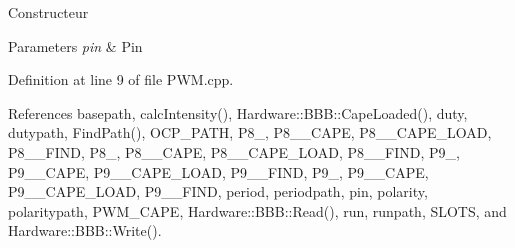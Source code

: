 Constructeur 


\begin{DoxyParams}{Parameters}
{\em pin} & Pin\\
\hline
\end{DoxyParams}


Definition at line 9 of file P\+W\+M.\+cpp.



References basepath, calc\+Intensity(), Hardware\+::\+B\+B\+B\+::\+Cape\+Loaded(), duty, dutypath, Find\+Path(), O\+C\+P\+\_\+\+P\+A\+T\+H, P8\+\_, P8\+\_\+\_\+\+C\+A\+P\+E, P8\+\_\+\_\+\+C\+A\+P\+E\+\_\+\+L\+O\+A\+D, P8\+\_\+\_\+\+F\+I\+N\+D, P8\+\_, P8\+\_\+\_\+\+C\+A\+P\+E, P8\+\_\+\_\+\+C\+A\+P\+E\+\_\+\+L\+O\+A\+D, P8\+\_\+\_\+\+F\+I\+N\+D, P9\+\_, P9\+\_\+\_\+\+C\+A\+P\+E, P9\+\_\+\_\+\+C\+A\+P\+E\+\_\+\+L\+O\+A\+D, P9\+\_\+\_\+\+F\+I\+N\+D, P9\+\_, P9\+\_\+\_\+\+C\+A\+P\+E, P9\+\_\+\_\+\+C\+A\+P\+E\+\_\+\+L\+O\+A\+D, P9\+\_\+\_\+\+F\+I\+N\+D, period, periodpath, pin, polarity, polaritypath, P\+W\+M\+\_\+\+C\+A\+P\+E, Hardware\+::\+B\+B\+B\+::\+Read(), run, runpath, S\+L\+O\+T\+S, and Hardware\+::\+B\+B\+B\+::\+Write().


